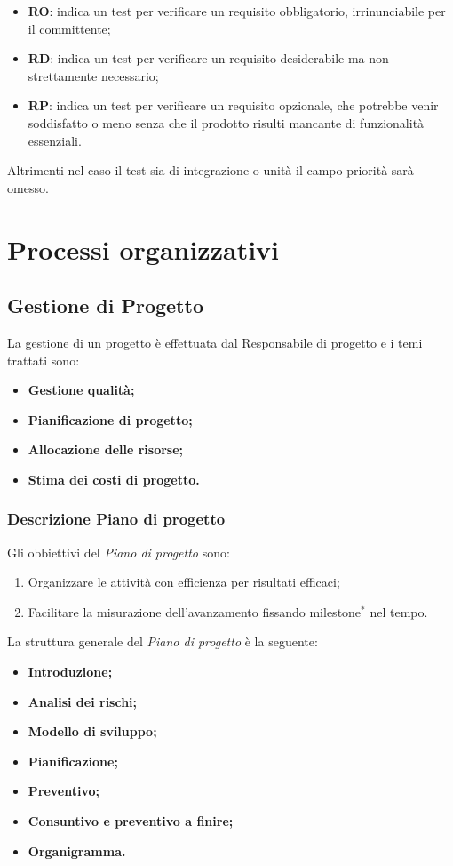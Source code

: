 \documentclass[11pt,a4paper]{article}
\begin{document}
{\begin{itemize}
	\item \textbf{RO}: indica un test per verificare un requisito obbligatorio, irrinunciabile per il committente;
	\item \textbf{RD}: indica un test per verificare un requisito desiderabile ma non strettamente necessario;
	\item \textbf{RP}: indica un test per verificare un requisito opzionale, che potrebbe venir soddisfatto o meno senza che il prodotto risulti mancante di funzionalità essenziali.
\end{itemize}
Altrimenti nel caso il test sia di integrazione o unità il campo priorità sarà omesso.
\\
	
	\section{Processi organizzativi}
	
	\subsection{Gestione di Progetto}
	La gestione di un progetto è effettuata dal Responsabile di progetto e i temi trattati sono:
	\begin{itemize}
		\item \textbf{Gestione qualità;}
		\item \textbf{Pianificazione di progetto;}
		\item \textbf{Allocazione delle risorse;}
		\item \textbf{Stima dei costi di progetto.}
	\end{itemize}
	
	\subsubsection{Descrizione Piano di progetto}
	
	Gli obbiettivi del \textit{Piano di progetto} sono:
	
	\begin{enumerate}
		\item Organizzare le attività con efficienza per risultati efficaci;
		\item Facilitare la misurazione dell'avanzamento fissando milestone$^*$ nel tempo.
	\end{enumerate}
	
	La struttura generale del \textit{Piano di progetto} è la seguente:
	\begin{itemize}
		\item \textbf{Introduzione;}
		\item \textbf{Analisi dei rischi;}
		\item \textbf{Modello di sviluppo;}
		\item \textbf{Pianificazione;}
		\item \textbf{Preventivo;}
		\item \textbf{Consuntivo e preventivo a finire;}
		\item \textbf{Organigramma.}
	\end{itemize}
	
}
\end{document}
